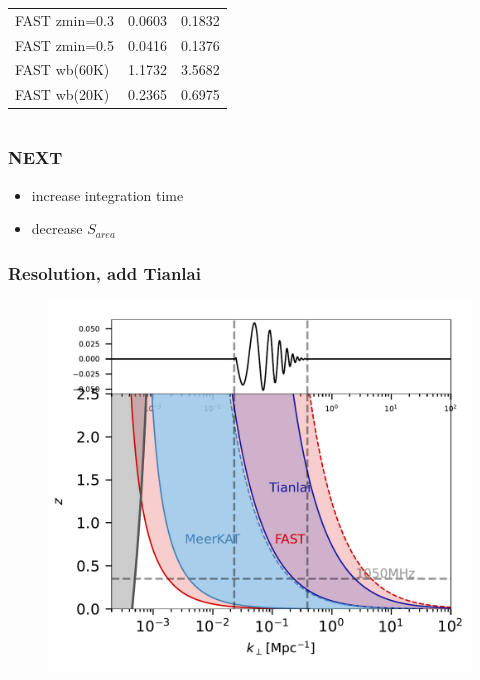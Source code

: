 \documentclass[UTF8]{beamer}
\begin{document}
\begin{frame}
\begin{columns}[c]
\begin{table}[]
\begin{tabular}{l|ll}
                FAST zmin=0.3        & 0.0603              & 0.1832              \\
                FAST zmin=0.5        & 0.0416              & 0.1376              \\
                FAST wb(60K)        & 1.1732              & 3.5682              \\
                FAST wb(20K) & 0.2365              & 0.6975              \\ \hline
                \end{tabular}
                \end{table}
        \end{columns}
    \end{frame}

    \begin{frame}
        \frametitle{NEXT}
        \begin{itemize}
            \item increase integration time
            \item decrease $S_{area}$
        \end{itemize}
    \end{frame}

    \begin{frame}
        \frametitle{Resolution, add Tianlai}
        \begin{figure}
            \centering
            \includegraphics[scale=0.4]{fig03-resolution-z-withTianlai.pdf}
        \end{figure}
    \end{frame}
    
\end{document}
